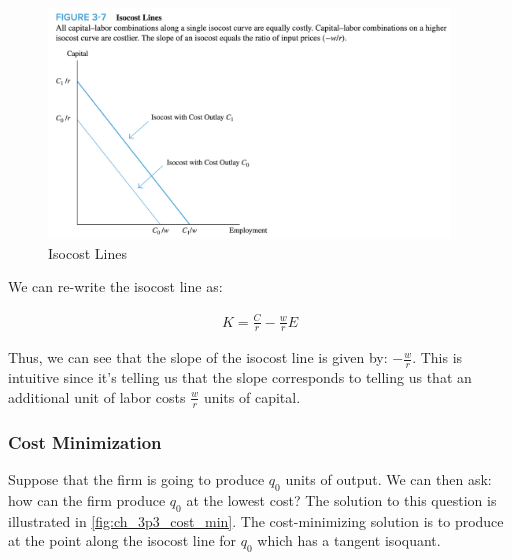 \FloatBarrier

\begin{figure}[!htb]
    \centering
        \includegraphics[width=0.95\textwidth]{../input/ch_3p3_isocost_intro.png}
    \caption{Isocost Lines}
    \label{fig:ch_3p3_isocost_intro}
\end{figure}

\FloatBarrier

We can re-write the isocost line 
as:

\begin{align}
    K=\frac{C}{r}-\frac{w}{r} E
\end{align}

Thus, we can see that the slope of the isocost line 
is given by: $-\frac{w}{r}$.
This is intuitive since it's telling us that 
the slope corresponds to telling us that 
an additional unit of labor costs 
$\frac{w}{r}$ units of capital.

\subsubsection{Cost Minimization}

Suppose that the firm is going to 
produce $q_0$ units of output. 
We can then ask: how can the firm
produce $q_0$ at the lowest cost?
The solution to this question is illustrated 
in \autoref{fig:ch_3p3_cost_min}.
The cost-minimizing solution is to 
produce at the point along the isocost line 
for $q_0$ which has a tangent isoquant.

\FloatBarrier

